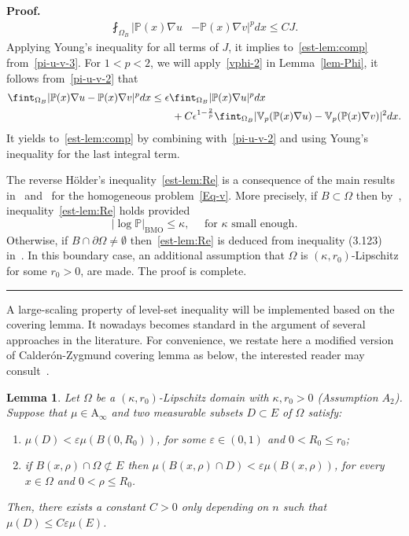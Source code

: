 \documentclass[a4paper, 11pt]{article}
\newtheorem{lemma}[theorem]{Lemma}
\newenvironment{proof}[1][Proof]{\textbf{#1.} }{\hfill\rule{0.5em}{0.5em}}
\begin{document}
\begin{proof}
\begin{align}\label{pi-u-v-3}
\fint_{\Omega_B} |\mathbb{P}(x)\nabla u & - \mathbb{P}(x)\nabla v|^p dx  \le C J.
\end{align}
Applying Young's inequality for all terms of $J$, it implies to~\eqref{est-lem:comp} from~\eqref{pi-u-v-3}. For $1<p<2$, we will apply~\eqref{vphi-2} in Lemma~\ref{lem-Phi}, it follows from~\eqref{pi-u-v-2} that
\begin{align}
\fint_{\Omega_B} |\mathbb{P}(x)\nabla u - \mathbb{P}(x)\nabla v|^p dx & \le \epsilon \fint_{\Omega_B} |\mathbb{P}(x)\nabla u|^p dx \notag \\
& \qquad + C {\epsilon}^{1 -\frac{2}{p}} \fint_{\Omega_B} |\mathbb{V}_{p}(\mathbb{P}(x) \nabla u) - \mathbb{V}_{p}(\mathbb{P}(x) \nabla v)|^2 dx. \notag
\end{align}
It yields to~\eqref{est-lem:comp} by combining with~\eqref{pi-u-v-2} and  using Young's inequality for the last integral term.

The reverse H\"older's inequality~\eqref{est-lem:Re} is a consequence of the main results in~\cite{BDGN2022} and~\cite{BBDL2023} for the homogeneous problem~\eqref{Eq-v}. More precisely, if $B \subset \Omega$ then by~\cite[Theorem 2]{BDGN2022}, inequality~\eqref{est-lem:Re} holds provided 
$$|\log \mathbb{P}|_{\mathrm{BMO}} \le \kappa, \quad \mbox{ for } \kappa \mbox{ small enough.}$$ 
Otherwise, if $B \cap \partial \Omega \neq \emptyset$ then~\eqref{est-lem:Re} is deduced from inequality (3.123) in~\cite{BBDL2023}. In this boundary case, an additional assumption that $\Omega$ is $(\kappa,r_0)$-Lipschitz for some $r_0>0$, are made. The proof is complete.
\end{proof}

A large-scaling property of level-set inequality will be implemented based on the covering lemma. It nowadays becomes standard in the argument of several approaches in the literature. For convenience, we restate here a modified version of Calder\'on-Zygmund covering lemma as below, the interested reader may consult~\cite{CC1995, Caffa1998, Vitali}. 

\begin{lemma}\label{lem:Vitali}
Let $\Omega$ be a $(\kappa, r_0)$-Lipschitz domain with $\kappa, r_0>0$ (Assumption $A_2$). Suppose that $\mu \in \mathrm{A}_{\infty}$ and two measurable subsets $D\subset E$ of $\Omega$ satisfy:
\begin{enumerate}
\item[i)] $\mu(D) < \varepsilon \mu(B(0,R_0))$, for some $\varepsilon \in (0,1)$ and $0<R_0\le r_0$;
\item[ii)] if $B(x,\rho)\cap \Omega \not\subset E$ then $\mu(B(x,\rho)\cap D) < \varepsilon \mu(B(x,\rho))$, for every $x\in \Omega$ and $0<\rho \le R_0$.
\end{enumerate} 	
Then, there exists a constant $C>0$ only depending on $n$ such that $\mu(D) \leq C\varepsilon \mu(E)$.
\end{lemma}
\end{document}
